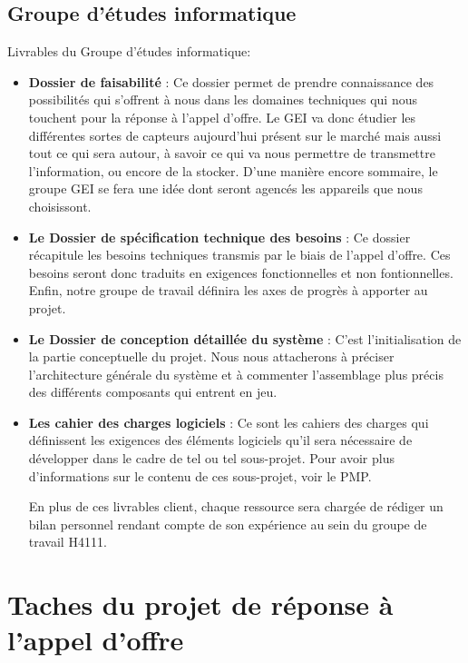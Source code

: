     \subsection{Groupe d'études informatique}
Livrables du Groupe d'études informatique:   
\begin{itemize}
\item \textbf{Dossier de faisabilité} : Ce dossier permet de prendre connaissance des possibilités qui s'offrent à nous dans les domaines techniques qui nous touchent pour la réponse à l'appel d'offre. Le GEI va donc étudier les différentes sortes de capteurs aujourd'hui présent sur le marché mais aussi tout ce qui sera autour, à savoir ce qui va nous permettre de transmettre l'information, ou encore de la stocker. D'une manière encore sommaire, le groupe GEI se fera une idée dont seront agencés les appareils que nous choisissont.
\item \textbf{Le Dossier de spécification technique des besoins} : Ce dossier récapitule les besoins techniques transmis par le biais de l'appel d'offre. Ces besoins seront donc traduits en exigences fonctionnelles et non fontionnelles. Enfin, notre groupe de travail définira les axes de progrès à apporter au projet.
\item \textbf{Le Dossier de conception détaillée du système} :  C'est l'initialisation de la partie conceptuelle du projet. Nous nous attacherons à préciser l'architecture générale du système et à commenter l'assemblage plus précis des différents composants qui entrent en jeu.
\item \textbf{Les cahier des charges logiciels} :  Ce sont les cahiers des charges qui définissent les exigences des éléments logiciels qu'il sera nécessaire de développer dans le cadre de tel ou tel sous-projet. Pour avoir plus d'informations sur le contenu de ces sous-projet, voir le PMP.

En plus de ces livrables client, chaque ressource sera chargée de rédiger un bilan personnel rendant compte de son expérience au sein du groupe de travail H4111.

\end{itemize}

\section{Taches du projet de réponse à l'appel d'offre}
